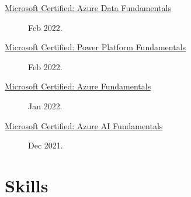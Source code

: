 \documentclass{article}
\begin{document}
\begin{description}
  \item [\href{https://learn.microsoft.com/api/credentials/share/en-us/AlexKoikCestone-7541/37294D69297F1741?sharingId=DCF7D068E6ED12E6}{Microsoft Certified: Azure Data Fundamentals}] Feb 2022.
  \item [\href{https://learn.microsoft.com/api/credentials/share/en-us/AlexKoikCestone-7541/CE492D7BE04E2F0D?sharingId=DCF7D068E6ED12E6}{Microsoft Certified: Power Platform Fundamentals}] Feb 2022.
  \item [\href{https://learn.microsoft.com/api/credentials/share/en-us/AlexKoikCestone-7541/51E3A61AEA2E3998?sharingId=DCF7D068E6ED12E6}{Microsoft Certified: Azure Fundamentals}] Jan 2022.
  \item [\href{https://learn.microsoft.com/api/credentials/share/en-us/AlexKoikCestone-7541/32EE850D92B0C609?sharingId=DCF7D068E6ED12E6}{Microsoft Certified: Azure AI Fundamentals}] Dec 2021.
\end{description}

\vspace{-1em}
\section*{Skills}\vspace{-0.5em}
\end{document}
